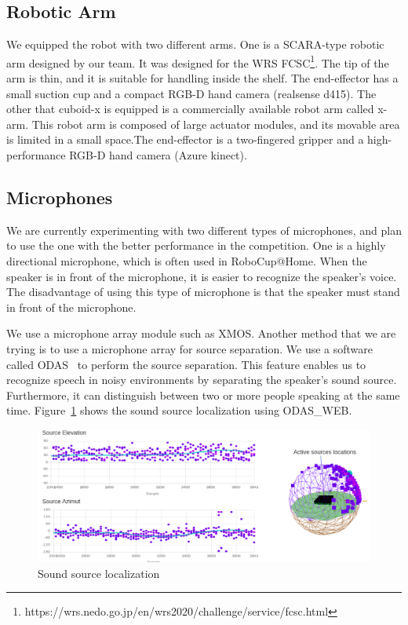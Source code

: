 \documentclass[runningheads,a4paper]{llncs}
\begin{document}
\subsection{Robotic Arm}
We equipped the robot with two different arms.
One is a SCARA-type robotic arm designed by our team. It was designed for the WRS FCSC\footnote{https://wrs.nedo.go.jp/en/wrs2020/challenge/service/fcsc.html}. The tip of the arm is thin, and it is suitable for handling inside the shelf. The end-effector has a small suction cup and a compact RGB-D hand camera (realsense d415).
The other that cuboid-x is equipped is a commercially available robot arm called x-arm. This robot arm is composed of large actuator modules, and its movable area is limited in a small space.The end-effector is a two-fingered gripper and a high-performance RGB-D hand camera (Azure kinect).

\subsection{Microphones}
We are currently experimenting with two different types of microphones, and plan to use the one with the better performance in the competition.
One is a highly directional microphone, which is often used in RoboCup@Home.
When the speaker is in front of the microphone, it is easier to recognize the speaker's voice. The disadvantage of using this type of microphone is that the speaker must stand in front of the microphone.

We use a microphone array module such as XMOS.
Another method that we are trying is to use a microphone array for source separation.
We use a software called ODAS~\cite{Grondin201963} to perform the source separation.
This feature enables us to recognize speech in noisy environments by separating the speaker's sound source. Furthermore, it can distinguish between two or more people speaking at the same time. Figure~\ref{fig:odas} shows the sound source localization using ODAS\_WEB.
\begin{figure}[tbp]
    \centering
    \includegraphics[width=0.6\linewidth]{images/odas_web_side.png}
    \caption{Sound source localization}
    \label{fig:odas}
\end{figure}
\end{document}
